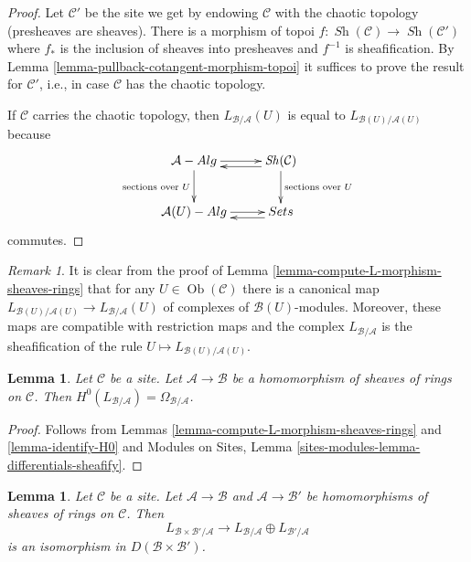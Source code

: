 \documentclass{stacks-project}
\theoremstyle{plain}
\newtheorem{lemma}[subsection]{Lemma}
\theoremstyle{definition}
\theoremstyle{remark}
\newtheorem{remark}[subsection]{Remark}
\numberwithin{equation}{subsection}
\def\Ob{\mathop{\mathrm{Ob}}\nolimits}
\def\Sh{\mathop{\mathit{Sh}}\nolimits}
\begin{document}
\begin{proof}
Let $\mathcal{C}'$ be the site we get by endowing $\mathcal{C}$ with the
chaotic topology (presheaves are sheaves). There is a morphism of topoi
$f : \Sh(\mathcal{C}) \to \Sh(\mathcal{C}')$ where $f_*$ is the inclusion
of sheaves into presheaves and $f^{-1}$ is sheafification.
By Lemma \ref{lemma-pullback-cotangent-morphism-topoi}
it suffices to prove the result for $\mathcal{C}'$, i.e.,
in case $\mathcal{C}$ has the chaotic topology.

\medskip\noindent
If $\mathcal{C}$ carries the chaotic topology, then
$L_{\mathcal{B}/\mathcal{A}}(U)$ is equal to
$L_{\mathcal{B}(U)/\mathcal{A}(U)}$ because
$$
\xymatrix{
\mathcal{A}\textit{-Alg} \ar[d]_{\text{sections over }U} \ar[r] &
\Sh(\mathcal{C}) \ar@<1ex>[l] \ar[d]^{\text{sections over }U} \\
\mathcal{A}(U)\textit{-Alg} \ar[r] & \textit{Sets} \ar@<1ex>[l]
}
$$
commutes.
\end{proof}

\begin{remark}
\label{remark-map-sections-over-U}
It is clear from the proof of
Lemma \ref{lemma-compute-L-morphism-sheaves-rings}
that for any $U \in \Ob(\mathcal{C})$ there is a canonical map
$L_{\mathcal{B}(U)/\mathcal{A}(U)} \to L_{\mathcal{B}/\mathcal{A}}(U)$
of complexes of $\mathcal{B}(U)$-modules. Moreover, these maps
are compatible with restriction maps and the complex
$L_{\mathcal{B}/\mathcal{A}}$
is the sheafification of the rule $U \mapsto L_{\mathcal{B}(U)/\mathcal{A}(U)}$.
\end{remark}

\begin{lemma}
\label{lemma-H0-L-morphism-sheaves-rings}
Let $\mathcal{C}$ be a site. Let $\mathcal{A} \to \mathcal{B}$ be a
homomorphism of sheaves of rings on $\mathcal{C}$. Then
$H^0(L_{\mathcal{B}/\mathcal{A}}) = \Omega_{\mathcal{B}/\mathcal{A}}$.
\end{lemma}

\begin{proof}
Follows from Lemmas \ref{lemma-compute-L-morphism-sheaves-rings}
and \ref{lemma-identify-H0} and
Modules on Sites, Lemma \ref{sites-modules-lemma-differentials-sheafify}.
\end{proof}

\begin{lemma}
\label{lemma-compute-L-product-sheaves-rings}
Let $\mathcal{C}$ be a site. Let $\mathcal{A} \to \mathcal{B}$
and $\mathcal{A} \to \mathcal{B}'$ be homomorphisms of sheaves of rings
on $\mathcal{C}$. Then
$$
L_{\mathcal{B} \times \mathcal{B}'/\mathcal{A}}
\longrightarrow
L_{\mathcal{B}/\mathcal{A}} \oplus L_{\mathcal{B}'/\mathcal{A}}
$$
is an isomorphism in $D(\mathcal{B} \times \mathcal{B}')$.
\end{lemma}
\end{document}
